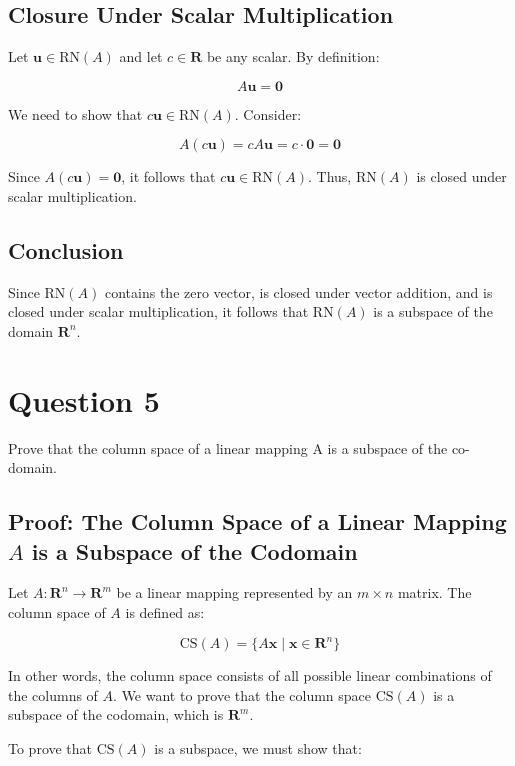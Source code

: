 \documentclass{article}
\begin{document}
\subsection{Closure Under Scalar Multiplication}

Let \( \mathbf{u} \in \text{RN}(A) \) and let \( c \in \mathbf{R} \) be any scalar. By definition:

\[
A \mathbf{u} = \mathbf{0}
\]

We need to show that \( c\mathbf{u} \in \text{RN}(A) \). Consider:

\[
A(c\mathbf{u}) = c A \mathbf{u} = c \cdot \mathbf{0} = \mathbf{0}
\]

Since \( A(c\mathbf{u}) = \mathbf{0} \), it follows that \( c\mathbf{u} \in \text{RN}(A) \). Thus, \( \text{RN}(A) \) is closed under scalar multiplication.

\subsection{Conclusion}

Since \( \text{RN}(A) \) contains the zero vector, is closed under vector addition, and is closed under scalar multiplication, it follows that \( \text{RN}(A) \) is a subspace of the domain \( \mathbf{R}^n \).

\section{Question 5}

Prove that the column space of a linear mapping A is a subspace of the co-domain.

\subsection{Proof: The Column Space of a Linear Mapping \( A \) is a Subspace of the Codomain}

Let \( A: \mathbf{R}^n \to \mathbf{R}^m \) be a linear mapping represented by an \( m \times n \) matrix. The column space of \( A \) is defined as:

\[
\text{CS}(A) = \{ A \mathbf{x} \mid \mathbf{x} \in \mathbf{R}^n \}
\]

In other words, the column space consists of all possible linear combinations of the columns of \( A \). We want to prove that the column space \( \text{CS}(A) \) is a subspace of the codomain, which is \( \mathbf{R}^m \).

To prove that \( \text{CS}(A) \) is a subspace, we must show that:
\end{document}
